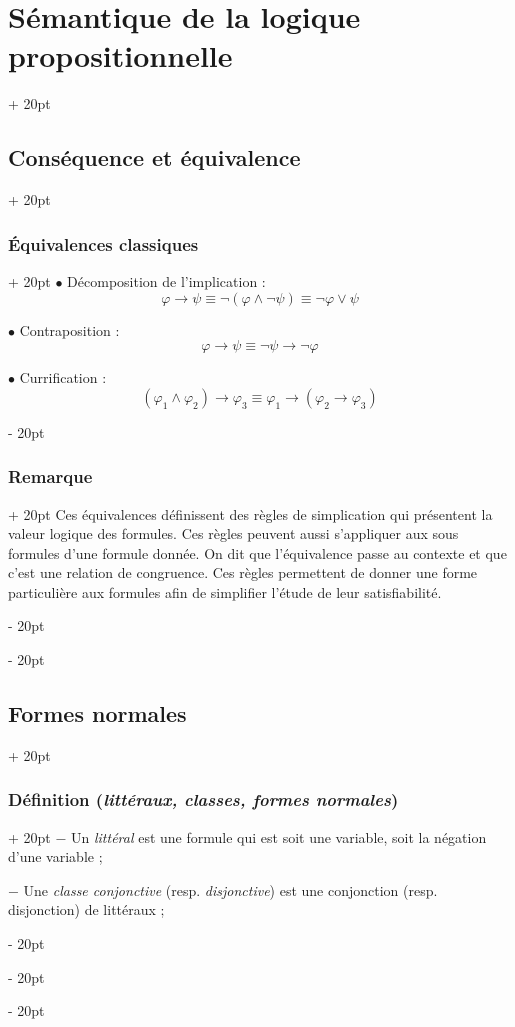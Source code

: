 \documentclass[a4paper, 12pt, twoside]{article}
\newcommand{\ind}[1][20pt]{\advance\leftskip + #1}
\newcommand{\deind}[1][20pt]{\advance\leftskip - #1}
\newenvironment{indt}[2][20pt]{#2 \par \ind[#1]}{\par \deind} %
\begin{document}
\begin{indt}{\section{Sémantique de la logique propositionnelle}}
\begin{indt}{\subsection{Conséquence et équivalence}}
\begin{indt}{\subsubsection{\'Equivalences classiques}}
                $\bullet$ Décomposition de l'implication :
                    \[ \varphi \rightarrow \psi \equiv \neg (\varphi \wedge \neg \psi) \equiv \neg \varphi \vee \psi \]
                
                $\bullet$ Contraposition :
                    \[ \varphi \rightarrow \psi \equiv \neg \psi \rightarrow \neg \varphi \]
                
                $\bullet$ Currification :
                    \[ (\varphi_1 \wedge \varphi_2) \rightarrow \varphi_3 \equiv \varphi_1 \rightarrow (\varphi_2 \rightarrow \varphi_3) \]
            \end{indt}
            
            \vspace{12pt}
            
            \begin{indt}{\subsubsection{Remarque}}
                Ces équivalences définissent des règles de simplication qui présentent la valeur logique des formules. Ces règles peuvent aussi s'appliquer aux sous formules d'une formule donnée. On dit que l'équivalence passe au contexte et que c'est une relation de congruence. Ces règles permettent de donner une forme particulière aux formules afin de simplifier l'étude de leur satisfiabilité.
            \end{indt}
        \end{indt}
        
        \vspace{12pt}
        
        \begin{indt}{\subsection{Formes normales}}
            \begin{indt}{\subsubsection{Définition (\textit{littéraux, classes, formes normales})}}
                $-$ Un \textit{littéral} est une formule qui est soit une variable, soit la négation d'une variable ;
                
                $-$ Une \textit{classe conjonctive} (resp. \textit{disjonctive}) est une conjonction (resp. disjonction) de littéraux ;
                

\end{indt}
\end{indt}
\end{indt}
\end{document}
